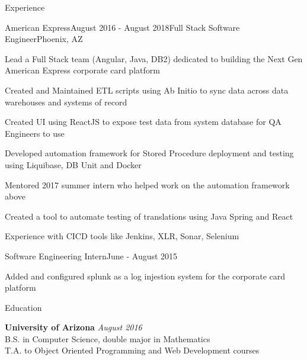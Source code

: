 \documentclass{resume} %
\begin{document}
\begin{rSection}{Experience}
\begin{rSubsection}{American Express}{August 2016 - August 2018}{Full Stack Software Engineer}{Phoenix, AZ}
\item Lead a Full Stack team (Angular, Java, DB2) dedicated to building the Next Gen American Express corporate card platform
\item Created and Maintained ETL scripts using Ab Initio to sync data across data warehouses and systems of record
\item Created UI using ReactJS to expose test data from system database for QA Engineers to use
\item Developed automation framework for Stored Procedure deployment and testing using Liquibase, DB Unit and Docker
\item Mentored 2017 summer intern who helped work on the automation framework above

\item Created a tool to automate testing of translations using Java Spring and React
\item Experience with CICD tools like Jenkins, XLR, Sonar, Selenium
\end{rSubsection}

\begin{rSubsection}{}{}{Software Engineering Intern}{June - August 2015}
\item Added and configured splunk as a log injestion system for the corporate card platform

\end{rSubsection}

\end{rSection}

\begin{rSection}{Education}
	
	{\bf University of Arizona} \hfill {\em August 2016} \\ 
	B.S. in Computer Science, double major in Mathematics  \smallskip \\
	\smallskip T.A. to Object Oriented Programming and Web Development courses
\end{rSection}
\end{document}
